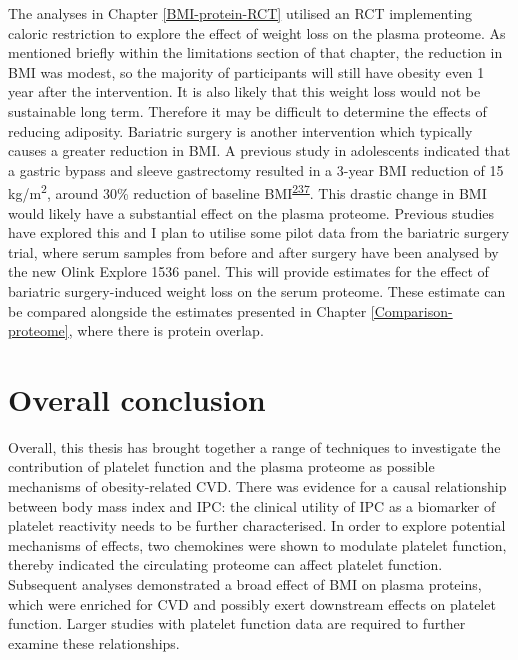 \documentclass[11pt,twoside]{bristolthesis}
\begin{document}
The analyses in Chapter \ref{BMI-protein-RCT} utilised an RCT implementing caloric restriction to explore the effect of weight loss on the plasma proteome. As mentioned briefly within the limitations section of that chapter, the reduction in BMI was modest, so the majority of participants will still have obesity even 1 year after the intervention. It is also likely that this weight loss would not be sustainable long term. Therefore it may be difficult to determine the effects of reducing adiposity. Bariatric surgery is another intervention which typically causes a greater reduction in BMI. A previous study in adolescents indicated that a gastric bypass and sleeve gastrectomy resulted in a 3-year BMI reduction of 15 kg/m\textsuperscript{2}, around 30\% reduction of baseline BMI\textsuperscript{\protect\hyperlink{ref-Inge2016}{237}}. This drastic change in BMI would likely have a substantial effect on the plasma proteome. Previous studies have explored this and I plan to utilise some pilot data from the bariatric surgery trial, where serum samples from before and after surgery have been analysed by the new Olink Explore 1536 panel. This will provide estimates for the effect of bariatric surgery-induced weight loss on the serum proteome. These estimate can be compared alongside the estimates presented in Chapter \ref{Comparison-proteome}, where there is protein overlap.

\hypertarget{overall-conclusion}{%
\section{Overall conclusion}\label{overall-conclusion}}

Overall, this thesis has brought together a range of techniques to investigate the contribution of platelet function and the plasma proteome as possible mechanisms of obesity-related CVD. There was evidence for a causal relationship between body mass index and IPC: the clinical utility of IPC as a biomarker of platelet reactivity needs to be further characterised. In order to explore potential mechanisms of effects, two chemokines were shown to modulate platelet function, thereby indicated the circulating proteome can affect platelet function. Subsequent analyses demonstrated a broad effect of BMI on plasma proteins, which were enriched for CVD and possibly exert downstream effects on platelet function. Larger studies with platelet function data are required to further examine these relationships.

\appendix
\end{document}
